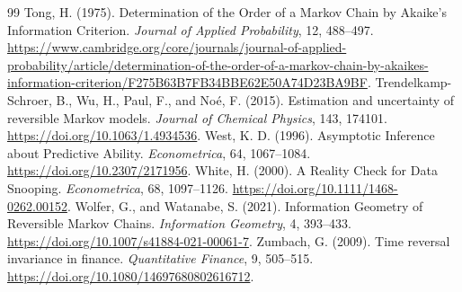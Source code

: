 \begin{thebibliography}{99}
 Tong, H. (1975). Determination of the Order of a Markov Chain by Akaike's Information Criterion. \textit{Journal of Applied Probability}, 12, 488--497. \url{https://www.cambridge.org/core/journals/journal-of-applied-probability/article/determination-of-the-order-of-a-markov-chain-by-akaikes-information-criterion/F275B63B7FB34BBE62E50A74D23BA9BF}.
 Trendelkamp-Schroer, B., Wu, H., Paul, F., and Noé, F. (2015). Estimation and uncertainty of reversible Markov models. \textit{Journal of Chemical Physics}, 143, 174101. \url{https://doi.org/10.1063/1.4934536}.
 West, K. D. (1996). Asymptotic Inference about Predictive Ability. \textit{Econometrica}, 64, 1067--1084. \url{https://doi.org/10.2307/2171956}.
 White, H. (2000). A Reality Check for Data Snooping. \textit{Econometrica}, 68, 1097--1126. \url{https://doi.org/10.1111/1468-0262.00152}.
 Wolfer, G., and Watanabe, S. (2021). Information Geometry of Reversible Markov Chains. \textit{Information Geometry}, 4, 393--433. \url{https://doi.org/10.1007/s41884-021-00061-7}.
 Zumbach, G. (2009). Time reversal invariance in finance. \textit{Quantitative Finance}, 9, 505--515. \url{https://doi.org/10.1080/14697680802616712}.
\end{thebibliography}